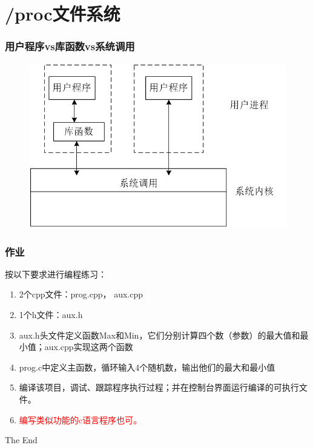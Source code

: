 \documentclass{beamer}
\begin{document}
\section{/proc文件系统}
\begin{frame}

\frametitle{用户程序vs库函数vs系统调用}

\begin{figure}
\includegraphics[width=1\linewidth]{601}
\end{figure}
\end{frame}

\begin{frame}
\frametitle{作业}
按以下要求进行编程练习：
\begin{enumerate}
\item
2个cpp文件：prog.cpp， aux.cpp
\item
1个h文件：aux.h
\item
aux.h头文件定义函数Max和Min，它们分别计算四个数（参数）的最大值和最小值；aux.cpp实现这两个函数
\item
prog.c中定义主函数，循环输入4个随机数，输出他们的最大和最小值
\item
编译该项目，调试、跟踪程序执行过程；并在控制台界面运行编译的可执行文件。
\item
\textcolor{red}{编写类似功能的c语言程序也可。}
\end{enumerate}
\end{frame}



\begin{frame}
\Huge{\centerline{The End}}
\end{frame}

\end{document}
